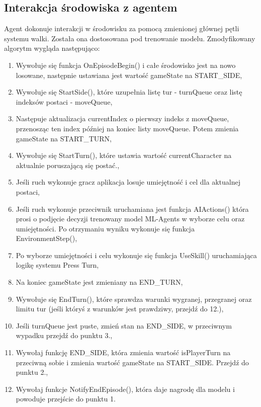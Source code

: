 \documentclass{SGGW-thesis}
\begin{document}
\subsection{Interakcja środowiska z agentem}
Agent dokonuje interakcji w środowisku za pomocą zmienionej głównej pętli systemu walki. Została ona dostosowana pod trenowanie modelu. Zmodyfikowany algorytm wygląda następująco:
\begin{enumerate}
  \item{Wywołuje się funkcja OnEpisodeBegin() i całe środowisko jest na nowo losowane, następnie ustawiana jest wartość gameState na START\_SIDE},
  \item{Wywołuje się StartSide(), które uzupełnia listę tur - turnQueue oraz listę indeksów postaci - moveQueue},
  \item{Następuje aktualizacja currentIndex o pierwszy indeks z moveQueue, przenosząc ten index później na koniec listy moveQueue. Potem zmienia gameState na START\_TURN},
  \item{Wywołuje się StartTurn(), które ustawia wartość currentCharacter na aktualnie poruszającą się postać.},
  \item{Jeśli ruch wykonuje gracz aplikacja losuje umiejętność i cel dla aktualnej postaci},
  \item{Jeśli ruch wykonuje przeciwnik uruchamiana jest funkcja AIActions() która prosi o podjęcie decyzji trenowany model ML-Agents w wyborze celu oraz umiejętności. Po otrzymaniu wyniku wykonuje się funkcja EnvironmentStep()},
  \item{Po wyborze umiejętności i celu wykonuje się funkcja UseSkill() uruchamiająca logikę systemu Press Turn},
  \item{Na koniec gameState jest zmieniany na END\_TURN},
  \item{Wywołuje się EndTurn(), które sprawdza warunki wygranej, przegranej oraz limitu tur (jeśli któryś z warunków jest prawdziwy, przejdź do 12.)},
  \item{Jeśli turnQueue jest puste, zmień stan na END\_SIDE, w przeciwnym wypadku przejdź do punktu 3.},
  \item{Wywołaj funkcję END\_SIDE, która zmienia wartość isPlayerTurn na przeciwną sobie i zmienia wartość gameState na START\_SIDE. Przejdź do punktu 2.},
  \item{Wywołaj funkcje NotifyEndEpisode(), która daje nagrodę dla modelu i powoduje przejście do punktu 1.}
\end{enumerate}
\pagebreak
\end{document}
